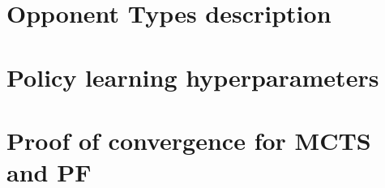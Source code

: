 \section{Opponent Types description}
\section{Policy learning hyperparameters}
\section{Proof of convergence for MCTS and PF}
